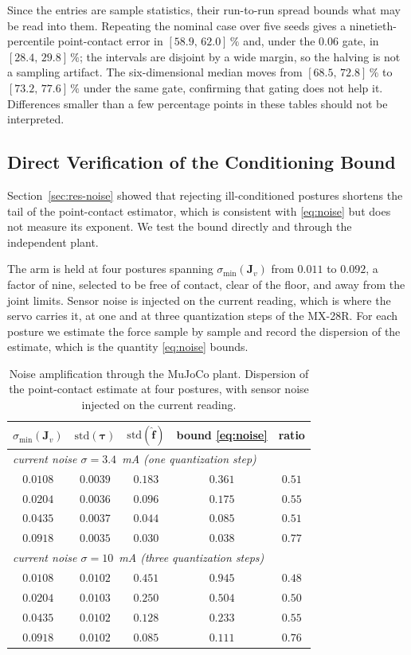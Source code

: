 \documentclass{ieeeaccess}
\newcommand{\Jv}{\bm{J}_{\!v}}
\begin{document}
Since the entries are sample statistics, their run-to-run spread bounds what may
be read into them. Repeating the nominal case over five seeds gives a
ninetieth-percentile point-contact error in $[58.9,\,62.0]\,\%$ and, under the
$0.06$ gate, in $[28.4,\,29.8]\,\%$; the intervals are disjoint by a wide margin,
so the halving is not a sampling artifact. The six-dimensional median moves from
$[68.5,\,72.8]\,\%$ to $[73.2,\,77.6]\,\%$ under the same gate, confirming that
gating does not help it. Differences smaller than a few percentage points in
these tables should not be interpreted.

\subsection{Direct Verification of the Conditioning Bound}
\label{sec:res-cond}
Section~\ref{sec:res-noise} showed that rejecting ill-conditioned postures
shortens the tail of the point-contact estimator, which is consistent with
\eqref{eq:noise} but does not measure its exponent. We test the bound directly and
through the independent plant.

The arm is held at four postures spanning $\sigma_{\min}(\Jv)$ from $0.011$ to
$0.092$, a factor of nine, selected to be free of contact, clear of the floor, and
away from the joint limits. Sensor noise is injected on the current reading, which
is where the servo carries it, at one and at three quantization steps of the
MX-28R. For each posture we estimate the force sample by sample and record the
dispersion of the estimate, which is the quantity \eqref{eq:noise} bounds.

\begin{table}[!t]
\caption{Noise amplification through the MuJoCo plant. Dispersion of the
point-contact estimate at four postures, with sensor noise injected on the current
reading.}
\label{tab:condlaw}
\centering
\footnotesize
\setlength{\tabcolsep}{4pt}
\begin{tabular}{ccccc}
\toprule
$\sigma_{\min}(\Jv)$ & $\mathrm{std}(\bm\tau)$ & $\mathrm{std}(\hat{\bm f})$
& bound \eqref{eq:noise} & ratio\\
\midrule
\multicolumn{5}{l}{\emph{current noise $\sigma=3.4$~mA (one quantization step)}}\\
$0.0108$ & $0.0039$ & $0.183$ & $0.361$ & $0.51$\\
$0.0204$ & $0.0036$ & $0.096$ & $0.175$ & $0.55$\\
$0.0435$ & $0.0037$ & $0.044$ & $0.085$ & $0.51$\\
$0.0918$ & $0.0035$ & $0.030$ & $0.038$ & $0.77$\\
\midrule
\multicolumn{5}{l}{\emph{current noise $\sigma=10$~mA (three quantization steps)}}\\
$0.0108$ & $0.0102$ & $0.451$ & $0.945$ & $0.48$\\
$0.0204$ & $0.0103$ & $0.250$ & $0.504$ & $0.50$\\
$0.0435$ & $0.0102$ & $0.128$ & $0.233$ & $0.55$\\
$0.0918$ & $0.0102$ & $0.085$ & $0.111$ & $0.76$\\
\bottomrule
\end{tabular}
\end{table}
\end{document}
